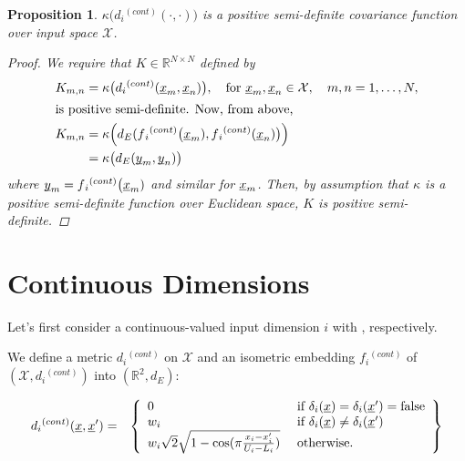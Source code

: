 \documentclass[letterpaper]{article}
\newcommand{\vect}[1]{\underline{\smash{#1}}}
\renewcommand{\v}[1]{\vect{#1}}
\newcommand{\reals}{\mathds{R}}
\newcommand{\sX}{\mathcal{X}}
\newtheorem{prop}[thm]{Proposition}
\begin{document}
\begin{prop}
  $\kappa\bigl(d{_i}^{(cont)}(\cdot,\cdot)\bigr)$ is a positive semi-definite covariance function over input space $\sX$. 
\label{prop:cont_psd_proof}
\begin{proof}
We require that $K \in \reals^{N\times N}$ defined by
\begin{align*}
 K_{m, n} & = \kappa\bigl(d{_i}^{(cont)}(\v{x}_m,\v{x}_n)\bigr)
,\quad \text{for }
\v{x}_m, \v{x}_n \in \sX,\quad m, n = 1, \ldots, N, 
\\
\intertext{is positive semi-definite. Now, from above,}
K_{m, n} & = \kappa\Bigl(d_E(f{_i}^{(cont)}\bigl(\v{x}_m), f{_i}^{(cont)}(\v{x}_n)\bigr)\Bigr) \\
& = \kappa\bigl(d_E(\v{y}_m, \v{y}_n)\bigr)
\end{align*}
where $\v{y}_m = f{_i}^{(cont)}\bigl(\v{x}_m)$ and similar for $\v{x}_m$. Then, by assumption that $\kappa$ is a positive semi-definite function over Euclidean space, $K$ is positive semi-definite. 
\end{proof}
\end{prop}


\section{Continuous Dimensions}

Let's first consider a continuous-valued input dimension $i$ with , respectively. 

We define a metric $d{_i}^{(cont)}$ on $\sX$ and an isometric embedding $f{_i}^{(cont)}$ of $(\sX, d{_i}^{(cont)})$ into $(\reals^{2},d_E)$:



\begin{eqnarray}
\nonumber{}d{_i}^{(cont)}(\v{x}, \v{x}') & = & \left\{\begin{array}{ll}
\nonumber{} 0 & \textrm{ if } \delta_i(\v{x}) = \delta_i(\v{x}') = \textrm{false}\\
\nonumber{} w_i & \textrm{ if } \delta_i(\v{x}) \neq \delta_i(\v{x}')\\
\nonumber{} w_i \sqrt{2} \sqrt{1 - \cos(\pi \frac{x_i-x_i'}{U_i-L_i})} & \textrm{ otherwise. }\end{array}\right\}
\end{eqnarray}
\end{document}
